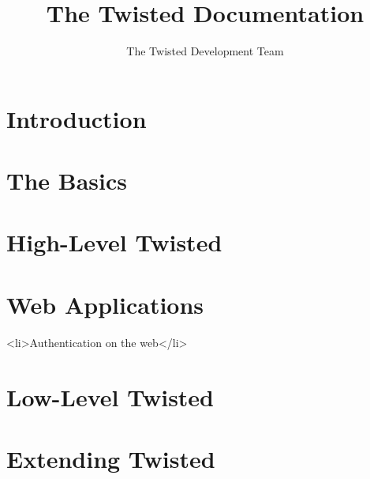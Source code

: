 \documentclass{book}
\title{The Twisted Documentation}
\author{The Twisted Development Team}
\begin{document}
\maketitle

\chapter{Introduction}











\chapter{The Basics}









\chapter{High-Level Twisted}












\chapter{Web Applications }






    <li>Authentication on the web</li>



\chapter{Low-Level Twisted }












\chapter{Extending Twisted}
\end{document}
